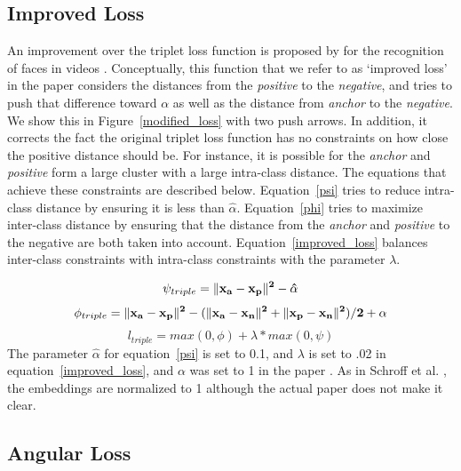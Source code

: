 \subsection{Improved Loss}

 An improvement over the triplet loss function is proposed by
 \cite{DBLP:conf/cvpr/SchroffKP15} for the recognition of faces in
 videos \cite{Zhang:2016:DML:3088616.3088665}.  Conceptually, this
 function that we refer to as `improved loss' in the paper considers
 the distances from the \textit{positive} to the \textit{negative}, and tries to push that
 difference toward $\alpha$ as well as the distance from
 \textit{anchor} to the \textit{negative}.  We show this in
 Figure~\ref{modified_loss} with two push arrows.  In addition, it corrects the fact the  original triplet loss function has no constraints on how close the positive distance should be.  For instance, it is possible for the \textit{anchor} and \textit{positive} form a large cluster with a large intra-class distance. The equations that achieve these constraints are described below.  Equation~\ref{psi} tries to reduce intra-class distance by ensuring it is less than $\hat{\alpha}$.  Equation~\ref{phi} tries to maximize inter-class distance by ensuring that the distance from the \textit{anchor} and \textit{positive} to the negative are both taken into account.  Equation~\ref{improved_loss} balances inter-class constraints with intra-class constraints with the parameter $\lambda$. 

\begin{equation}
  \psi_{triple} = \|\bf{x_{a}} - \bf{x_{p}}\|^2 - \hat{\alpha}
\label{psi}
\end{equation}
\begin{equation}
  \phi_{triple} = \|\bf{x_{a}} - \bf{x_{p}}\|^2 - (\|\bf{x_{a}}- \bf{x_{n}}\|^2 + \|\bf{x_{p}} - \bf{x_{n}}\|^2) / 2  + \alpha
\label{phi}
\end{equation}
\begin{equation}
  l_{triple} = max(0, \phi) + \lambda * max(0, \psi)
\label{improved_loss}
\end{equation}
The parameter $\hat{\alpha}$ for equation~\ref{psi} is set to 0.1, and $\lambda$ is set to .02 in equation~\ref{improved_loss}, and $\alpha$ was set to 1 in the paper \cite{Zhang:2016:DML:3088616.3088665}.  As in Schroff et al. \cite{DBLP:conf/cvpr/SchroffKP15}, the embeddings are normalized to 1 although the actual paper does not make it clear.

\subsection{Angular Loss}

